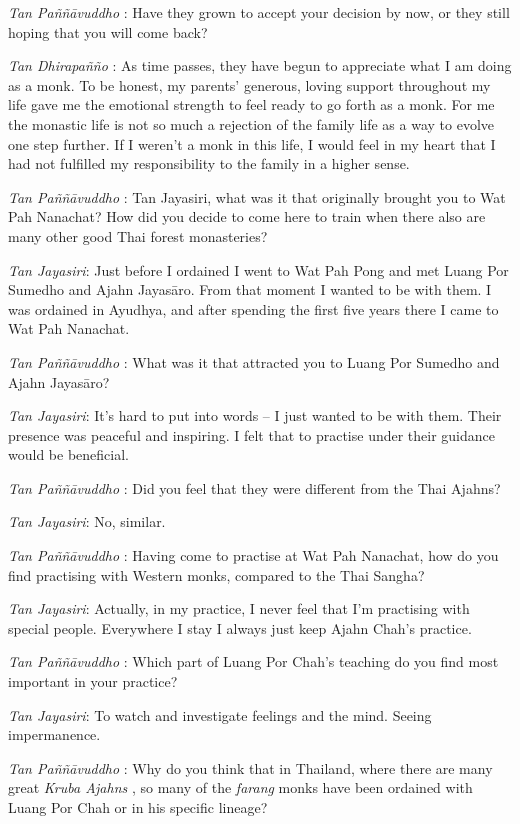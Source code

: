 \emph{Tan Paññāvuddho} : Have they grown to accept your decision by now,
or they still hoping that you will come back?

\emph{Tan Dhirapañño} : As time passes, they have begun to appreciate
what I am doing as a monk. To be honest, my parents' generous, loving
support throughout my life gave me the emotional strength to feel ready
to go forth as a monk. For me the monastic life is not so much a
rejection of the family life as a way to evolve one step further. If I
weren't a monk in this life, I would feel in my heart that I had not
fulfilled my responsibility to the family in a higher sense.

\emph{Tan Paññāvuddho} : Tan Jayasiri, what was it that originally
brought you to Wat Pah Nanachat? How did you decide to come here to
train when there also are many other good Thai forest monasteries?

\emph{Tan Jayasiri}: Just before I ordained I went to Wat Pah Pong and
met Luang Por Sumedho and Ajahn Jayasāro. From that moment I wanted to
be with them. I was ordained in Ayudhya, and after spending the first
five years there I came to Wat Pah Nanachat.

\emph{Tan Paññāvuddho} : What was it that attracted you to Luang Por
Sumedho and Ajahn Jayasāro?

\emph{Tan Jayasiri}: It's hard to put into words -- I just wanted to be
with them. Their presence was peaceful and inspiring. I felt that to
practise under their guidance would be beneficial.

\emph{Tan Paññāvuddho} : Did you feel that they were different from the
Thai Ajahns?

\emph{Tan Jayasiri}: No, similar.

\emph{Tan Paññāvuddho} : Having come to practise at Wat Pah Nanachat,
how do you find practising with Western monks, compared to the Thai
Sangha?

\emph{Tan Jayasiri}: Actually, in my practice, I never feel that I'm
practising with special people. Everywhere I stay I always just keep
Ajahn Chah's practice.

\emph{Tan Paññāvuddho} : Which part of Luang Por Chah's teaching do you
find most important in your practice?

\emph{Tan Jayasiri}: To watch and investigate feelings and the mind.
Seeing impermanence.

\emph{Tan Paññāvuddho} : Why do you think that in Thailand, where there
are many great \emph{Kruba Ajahns  }, so many of the \emph{farang} monks
have been ordained with Luang Por Chah or in his specific lineage?

